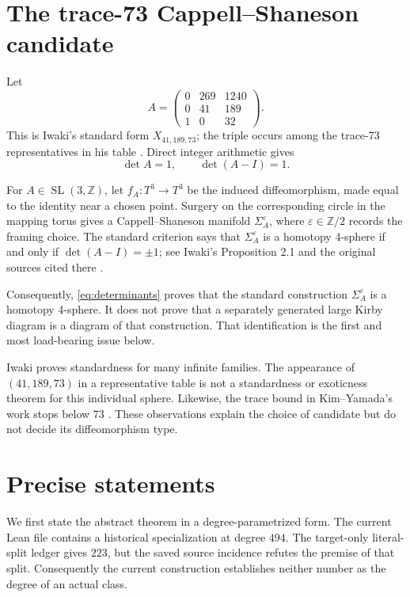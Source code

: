 \documentclass[11pt]{amsart}
\theoremstyle{definition}
\theoremstyle{remark}
\newcommand{\Z}{\mathbb{Z}}
\begin{document}
\section{The trace-73 Cappell--Shaneson candidate}

Let
\begin{equation}\label{eq:A}
A=\begin{pmatrix}
0&269&1240\\
0&41&189\\
1&0&32
\end{pmatrix}.
\end{equation}
This is Iwaki's standard form $X_{41,189,73}$; the triple occurs among the
trace-73 representatives in his table \cite[Table 2]{Iwaki2024}.  Direct
integer arithmetic gives
\begin{equation}\label{eq:determinants}
\det A=1,\qquad \det(A-I)=1.
\end{equation}

For $A\in \operatorname{SL}(3,\Z)$, let $f_A:T^3\to T^3$ be the induced
diffeomorphism, made equal to the identity near a chosen point.  Surgery on
the corresponding circle in the mapping torus gives a
Cappell--Shaneson manifold $\Sigma_A^\varepsilon$, where
$\varepsilon\in\Z/2$ records the framing choice.  The standard criterion says
that $\Sigma_A^\varepsilon$ is a homotopy 4-sphere if and only if
$\det(A-I)=\pm1$; see Iwaki's Proposition 2.1 and the original sources cited
there \cite{Iwaki2024,CappellShaneson1976}.

Consequently, \eqref{eq:determinants} proves that the standard construction
$\Sigma_A^\varepsilon$ is a homotopy 4-sphere.  It does not prove that a
separately generated large Kirby diagram is a diagram of that construction.
That identification is the first and most load-bearing issue below.

Iwaki proves standardness for many infinite families.  The appearance of
$(41,189,73)$ in a representative table is not a standardness or exoticness
theorem for this individual sphere.  Likewise, the trace bound in
Kim--Yamada's work stops below 73 \cite{KimYamada2017}.  These observations
explain the choice of candidate but do not decide its diffeomorphism type.

\section{Precise statements}

We first state the abstract theorem in a degree-parametrized form.  The current
Lean file contains a historical specialization at degree $494$.  The
target-only literal-split ledger gives $223$, but the saved source incidence
refutes the premise of that split.  Consequently the current construction
establishes neither number as the degree of an actual class.
\end{document}
